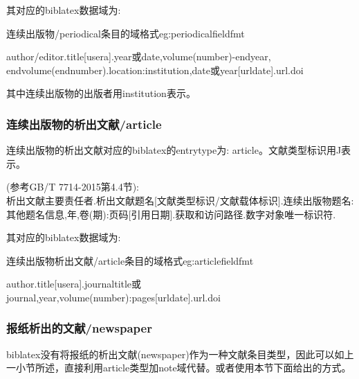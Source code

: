 其对应的biblatex数据域为:
\begin{example}{连续出版物/periodical条目的域格式}{eg:periodicalfieldfmt}
\begin{texlist}
author/editor.title[usera].year或date,volume(number)-endyear, endvolume(endnumber).location:institution,date或year[urldate].url.doi
\end{texlist}
\end{example}

其中连续出版物的出版者用institution表示。

\subsubsection{连续出版物的析出文献/article}
\begin{refentry}{}{}%
连续出版物的析出文献对应的biblatex的entrytype为: article。文献类型标识用J表示。

(参考GB/T 7714-2015第4.4节):\\
析出文献主要责任者.析出文献题名[文献类型标识/文献载体标识].连续出版物题名:其他题名信息,年,卷(期):页码[引用日期].获取和访问路径.数字对象唯一标识符.
\end{refentry}

其对应的biblatex数据域为:
\begin{example}{连续出版物析出文献/article条目的域格式}{eg:articlefieldfmt}
\begin{texlist}
author.title[usera].journaltitle或journal,year,volume(number):pages[urldate].url.doi
\end{texlist}
\end{example}


\subsubsection{报纸析出的文献/newspaper}\label{sec:standard}
biblatex没有将报纸的析出文献(newspaper)作为一种文献条目类型，因此可以如上一小节所述，直接利用article类型加note域代替。或者使用本节下面给出的方式。

